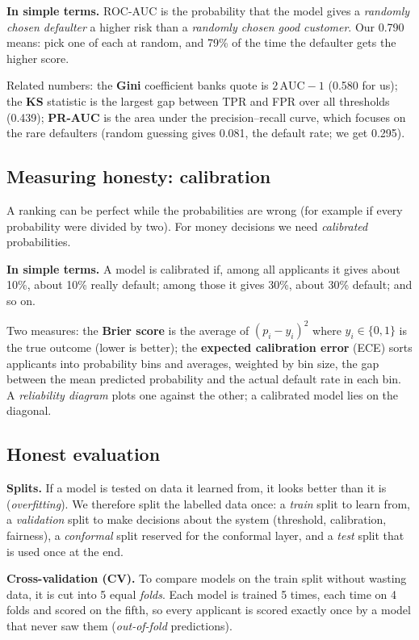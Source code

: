 \documentclass[conference,10pt]{IEEEtran}
\newcommand{\simple}[1]{\par\smallskip\noindent\colorbox{gray!13}{\parbox{\dimexpr\columnwidth-2\fboxsep\relax}{\small\textbf{In simple terms.} #1}}\par\smallskip}
\begin{document}
\simple{ROC-AUC is the probability that the model gives a \emph{randomly chosen defaulter} a
higher risk than a \emph{randomly chosen good customer}. Our 0.790 means: pick one of each at
random, and 79\% of the time the defaulter gets the higher score.}

Related numbers: the \textbf{Gini} coefficient banks quote is $2\,\mathrm{AUC}-1$ (0.580 for us);
the \textbf{KS} statistic is the largest gap between TPR and FPR over all thresholds (0.439);
\textbf{PR-AUC} is the area under the precision--recall curve, which focuses on the rare
defaulters (random guessing gives 0.081, the default rate; we get 0.295).

\subsection{Measuring honesty: calibration}
A ranking can be perfect while the probabilities are wrong (for example if every probability
were divided by two). For money decisions we need \emph{calibrated} probabilities.

\simple{A model is calibrated if, among all applicants it gives about 10\%, about 10\% really
default; among those it gives 30\%, about 30\% default; and so on.}

Two measures: the \textbf{Brier score} is the average of $(p_i - y_i)^2$ where $y_i \in \{0,1\}$
is the true outcome (lower is better); the \textbf{expected calibration error} (ECE) sorts
applicants into probability bins and averages, weighted by bin size, the gap between the mean
predicted probability and the actual default rate in each bin. A \emph{reliability diagram}
plots one against the other; a calibrated model lies on the diagonal.

\subsection{Honest evaluation}
\textbf{Splits.} If a model is tested on data it learned from, it looks better than it is
(\emph{overfitting}). We therefore split the labelled data once: a \emph{train} split to learn
from, a \emph{validation} split to make decisions about the system (threshold, calibration,
fairness), a \emph{conformal} split reserved for the conformal layer, and a \emph{test} split
that is used once at the end.

\textbf{Cross-validation (CV).} To compare models on the train split without wasting data, it is
cut into 5 equal \emph{folds}. Each model is trained 5 times, each time on 4 folds and scored on
the fifth, so every applicant is scored exactly once by a model that never saw them
(\emph{out-of-fold} predictions).
\end{document}
